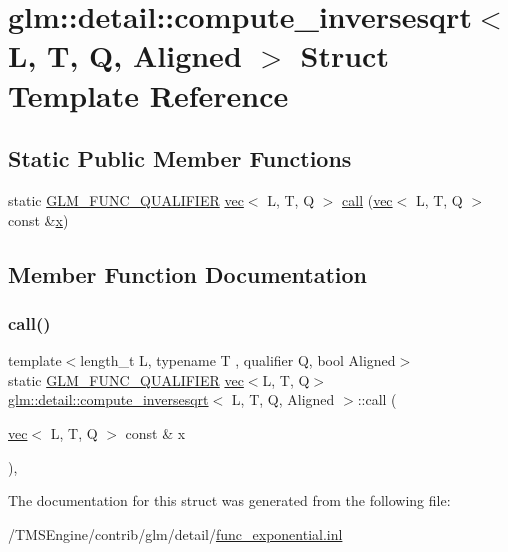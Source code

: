 \hypertarget{structglm_1_1detail_1_1compute__inversesqrt}{}\section{glm\+:\+:detail\+:\+:compute\+\_\+inversesqrt$<$ L, T, Q, Aligned $>$ Struct Template Reference}
\label{structglm_1_1detail_1_1compute__inversesqrt}
\subsection*{Static Public Member Functions}
\begin{DoxyCompactItemize}
\item 
static \hyperlink{setup_8hpp_a33fdea6f91c5f834105f7415e2a64407}{G\+L\+M\+\_\+\+F\+U\+N\+C\+\_\+\+Q\+U\+A\+L\+I\+F\+I\+ER} \hyperlink{structglm_1_1vec}{vec}$<$ L, T, Q $>$ \hyperlink{structglm_1_1detail_1_1compute__inversesqrt_a561ccd247f02dcc4b10254e7f841333c}{call} (\hyperlink{structglm_1_1vec}{vec}$<$ L, T, Q $>$ const \&\hyperlink{_s_d_l__opengl_8h_ad0e63d0edcdbd3d79554076bf309fd47}{x})
\end{DoxyCompactItemize}


\subsection{Member Function Documentation}
\mbox{\label{structglm_1_1detail_1_1compute__inversesqrt_a561ccd247f02dcc4b10254e7f841333c}} 
\subsubsection{\texorpdfstring{call()}{call()}}
{\footnotesize\ttfamily template$<$length\+\_\+t L, typename T , qualifier Q, bool Aligned$>$ \\
static \hyperlink{setup_8hpp_a33fdea6f91c5f834105f7415e2a64407}{G\+L\+M\+\_\+\+F\+U\+N\+C\+\_\+\+Q\+U\+A\+L\+I\+F\+I\+ER} \hyperlink{structglm_1_1vec}{vec}$<$L, T, Q$>$ \hyperlink{structglm_1_1detail_1_1compute__inversesqrt}{glm\+::detail\+::compute\+\_\+inversesqrt}$<$ L, T, Q, Aligned $>$\+::call (\begin{DoxyParamCaption}\item[{\hyperlink{structglm_1_1vec}{vec}$<$ L, T, Q $>$ const \&}]{x }\end{DoxyParamCaption})\hspace{0.3cm}{\ttfamily [inline]}, {\ttfamily [static]}}



The documentation for this struct was generated from the following file\+:\begin{DoxyCompactItemize}
\item 
/\+T\+M\+S\+Engine/contrib/glm/detail/\hyperlink{func__exponential_8inl}{func\+\_\+exponential.\+inl}\end{DoxyCompactItemize}
